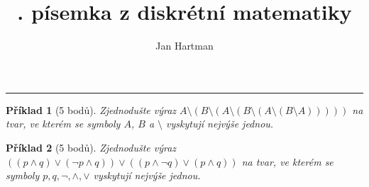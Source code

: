 \documentclass[10pt]{article}
\title{\tutnum. písemka z diskrétní matematiky}
\author{Jan Hartman}
\newcommand{\titlerule}{%
    \noindent %
    \makebox[\textwidth]{\large \thetitle \hfill Jméno: \hspace{3cm}}
    \rule{\textwidth}{0.4pt}%
}
\theoremstyle{definitionstyle}
\theoremstyle{problemstyle}
\newtheorem{problem}{Příklad}
\begin{document}
\titlerule

\begin{problem}[5 bodů]
Zjednodušte výraz $A \setminus ( B \setminus ( A \setminus ( B \setminus ( A \setminus ( B \setminus A )))))$ na tvar, ve kterém se symboly $A$, $B$ a $\setminus$ vyskytují nejvýše jednou.
\end{problem}

\begin{problem}[5 bodů]
Zjednodušte výraz $((p \wedge q) \vee (\neg p \wedge q) ) \vee ( (p \wedge \neg q) \vee (p \wedge q)  )$ na tvar, ve kterém se symboly $p,q,\neg,\wedge,\vee$ vyskytují nejvýše jednou.
\end{problem}
\end{document}
